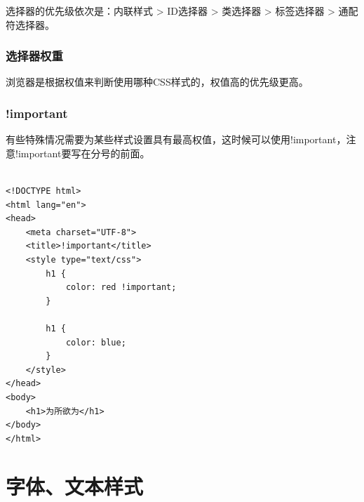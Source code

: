 选择器的优先级依次是：内联样式 > ID选择器 > 类选择器 > 标签选择器 > 通配符选择器。

\subsection{选择器权重}

浏览器是根据权值来判断使用哪种CSS样式的，权值高的优先级更高。

\begin{table}[H]
	\centering
	\caption{选择器权重}
\end{table}

\subsection{!important}

有些特殊情况需要为某些样式设置具有最高权值，这时候可以使用!important，注意!important要写在分号的前面。 \\

 \\
\begin{lstlisting}[style=htmlcssjs]
<!DOCTYPE html>
<html lang="en">
<head>
    <meta charset="UTF-8">
    <title>!important</title>
    <style type="text/css">
        h1 {
            color: red !important;
        }

        h1 {
            color: blue;
        }
    </style>
</head>
<body>
    <h1>为所欲为</h1>
</body>
</html>
\end{lstlisting}

\newpage

\chapter{字体、文本样式}

